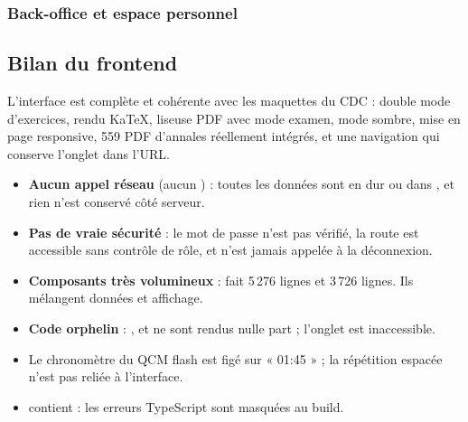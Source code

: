 \subsubsection{Back-office et espace personnel}

\subsection{Bilan du frontend}

\begin{ok}
L'interface est complète et cohérente avec les maquettes du CDC : double mode d'exercices, rendu KaTeX, liseuse PDF avec mode examen, mode sombre, mise en page responsive, 559 PDF d'annales réellement intégrés, et une navigation qui conserve l'onglet dans l'URL.
\end{ok}

\begin{alerte}
\begin{itemize}
  \item \textbf{Aucun appel réseau} (aucun ) : toutes les données sont en dur ou dans , et rien n'est conservé côté serveur.
  \item \textbf{Pas de vraie sécurité} : le mot de passe n'est pas vérifié, la route  est accessible sans contrôle de rôle, et  n'est jamais appelée à la déconnexion.
  \item \textbf{Composants très volumineux} :  fait 5\,276 lignes et  3\,726 lignes. Ils mélangent données et affichage.
  \item \textbf{Code orphelin} : ,  et  ne sont rendus nulle part ; l'onglet  est inaccessible.
  \item Le chronomètre du QCM flash est figé sur « 01:45 » ; la répétition espacée n'est pas reliée à l'interface.
  \item {} contient  : les erreurs TypeScript sont masquées au build.
\end{itemize}
\end{alerte}
